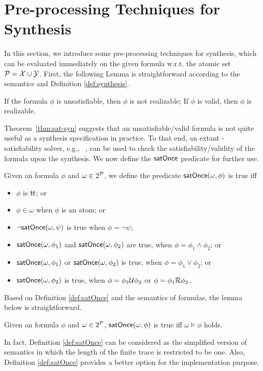 \section{Pre-processing Techniques for \ltlf Synthesis}
In this section, we introduce some pre-processing techniques for \ltlf synthesis, which can be evaluated immediately on the given \ltlf formula w.r.t. the atomic set $\P=\X\cup\Y$. First, the following Lemma is straightforward according to the \ltlf semantics and Definition \ref{def:synthesis}.

\begin{theorem}\label{thm:sat-syn}
	If the \ltlf formula $\phi$ is unsatisfiable, then $\phi$ is not realizable; If $\phi$ is valid, then $\phi$ is realizable.
\end{theorem}
Theorem~\ref{thm:sat-syn} suggests that an unsatisfiable/valid \ltlf formula is not quite useful as a synthesis specification in practice. 
To that end, an extant \ltlf-satisfiability solver, e.g., \aaltaf~\cite{LRPZV19}, can be used to check the satisfiability/validity of the formula upon the synthesis. We now define the $\satOnce$ predicate for further use. 

\begin{definition}\label{def:satOnce}
Given an \ltlf formula $\phi$ and $\omega\in 2^{\P}$, we define the predicate $\satOnce (\omega, \phi)$ is true iff 
\begin{itemize}
	\item $\phi$ is $\tt$; or
	\item $\phi \in \omega$ when $\phi$ is an atom; or 
	\item $\neg \satOnce (\omega, \psi)$ is true when $\phi = \neg\psi$;
	\item $\satOnce (\omega, \phi_1)$ and $\satOnce (\omega, \phi_2)$ are true, when $\phi = \phi_1\wedge\phi_2$; or 
	\item $\satOnce (\omega, \phi_1)$ or $\satOnce (\omega, \phi_2)$ is true, when $\phi = \phi_1\vee\phi_2$; or
	\item $\satOnce (\omega, \phi_2)$ is true, when $\phi = \phi_1\U\phi_2$ or $\phi = \phi_1\R\phi_2$.
\end{itemize} 
\end{definition}

Based on Definition \ref{def:satOnce} and the semantics of \ltlf formulas, the lemma below is straightforward. 

\begin{lemma}\label{lem:satOnce}
Given an \ltlf formula $\phi$ and $\omega\in 2^{\P}$, $\satOnce (\omega, \phi)$ is true iff $\omega\models\phi$ holds.
\end{lemma}
In fact, Definition \ref{def:satOnce} can be considered as the simplified version of \ltlf semantics in which the length of the finite trace is restricted to be one. Also, Definition \ref{def:satOnce} provides a better option for the implementation purpose. 

